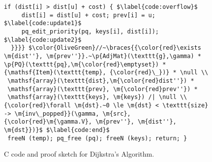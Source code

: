 \begin{figure}[t]
\begin{lstlisting}[mathescape=true,showlines=true]
    if (dist[i] > dist[u] + cost) { $\label{code:overflow}$
     dist[i] = dist[u] + cost; prev[i] = u; $\label{code:update1}$
     pq_edit_priority(pq, keys[i], dist[i]); $\label{code:update2}$
  }}}} $\color{OliveGreen}//~\braces{{\color{red}\exists \m{dist''}, \m{prev''}}.~\p{AdjMat}(\texttt{g},\gamma) * \p{PQ}(\texttt{pq},\m{\color{red}\emptyset}) * {\mathsf{Item}(\texttt{temp}, {\color{red}\_})} * \null \\
 \mathsf{array}(\texttt{dist},\m{\color{red}dist''}) *
 \mathsf{array}(\texttt{prev}, \m{\color{red}prev''}) *
 \mathsf{array}(\texttt{keys}, \m{keys}) /| \null \\
{\color{red}\forall \m{dst}.~0 \le \m{dst} < \texttt{size} -> \m{inv\_popped}}(\gamma, \m{src}, {\color{red}\m{\gamma.V}, \m{prev''}, \m{dist''}, \m{dst}})}$ $\label{code:end}$
 freeN (temp); pq_free (pq); freeN (keys); return; }
\end{lstlisting}
\vspace{-1em}
\caption{C code and proof sketch for Dijkstra's Algorithm.}
\vspace{-1em}
\label{fig:decorated}
\end{figure}



